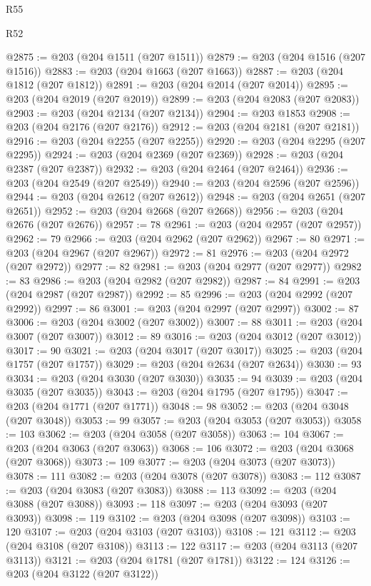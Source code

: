 \begin{lexlean}{R55}
\begin{lexlean}{R52}
\begin{coremodule}
{{{{{{{{{{{{{{{{{{{{{{{{{{{{{{{{{{{{{{{{{{{{{{{{{{{{{{{{{{{{{{{{{{{{{{{{{{{{{{{{{{{{{{{{{{{{{{{{{{{{{{{{{{{{{{{{{{{{{{{{{{{{{{{{{{{{{{{{{{{{{{{{{{{{{{{{{{{{{{{{{{{{{{{{{{{{{{{{{{{{{{{{{{{{{{{{{{{{{{@2875 := @203 (@204 @1511 (@207 @1511))
@2879 := @203 (@204 @1516 (@207 @1516))
@2883 := @203 (@204 @1663 (@207 @1663))
@2887 := @203 (@204 @1812 (@207 @1812))
@2891 := @203 (@204 @2014 (@207 @2014))
@2895 := @203 (@204 @2019 (@207 @2019))
@2899 := @203 (@204 @2083 (@207 @2083))
@2903 := @203 (@204 @2134 (@207 @2134))
@2904 := @203 @1853
@2908 := @203 (@204 @2176 (@207 @2176))
@2912 := @203 (@204 @2181 (@207 @2181))
@2916 := @203 (@204 @2255 (@207 @2255))
@2920 := @203 (@204 @2295 (@207 @2295))
@2924 := @203 (@204 @2369 (@207 @2369))
@2928 := @203 (@204 @2387 (@207 @2387))
@2932 := @203 (@204 @2464 (@207 @2464))
@2936 := @203 (@204 @2549 (@207 @2549))
@2940 := @203 (@204 @2596 (@207 @2596))
@2944 := @203 (@204 @2612 (@207 @2612))
@2948 := @203 (@204 @2651 (@207 @2651))
@2952 := @203 (@204 @2668 (@207 @2668))
@2956 := @203 (@204 @2676 (@207 @2676))
@2957 := 78
@2961 := @203 (@204 @2957 (@207 @2957))
@2962 := 79
@2966 := @203 (@204 @2962 (@207 @2962))
@2967 := 80
@2971 := @203 (@204 @2967 (@207 @2967))
@2972 := 81
@2976 := @203 (@204 @2972 (@207 @2972))
@2977 := 82
@2981 := @203 (@204 @2977 (@207 @2977))
@2982 := 83
@2986 := @203 (@204 @2982 (@207 @2982))
@2987 := 84
@2991 := @203 (@204 @2987 (@207 @2987))
@2992 := 85
@2996 := @203 (@204 @2992 (@207 @2992))
@2997 := 86
@3001 := @203 (@204 @2997 (@207 @2997))
@3002 := 87
@3006 := @203 (@204 @3002 (@207 @3002))
@3007 := 88
@3011 := @203 (@204 @3007 (@207 @3007))
@3012 := 89
@3016 := @203 (@204 @3012 (@207 @3012))
@3017 := 90
@3021 := @203 (@204 @3017 (@207 @3017))
@3025 := @203 (@204 @1757 (@207 @1757))
@3029 := @203 (@204 @2634 (@207 @2634))
@3030 := 93
@3034 := @203 (@204 @3030 (@207 @3030))
@3035 := 94
@3039 := @203 (@204 @3035 (@207 @3035))
@3043 := @203 (@204 @1795 (@207 @1795))
@3047 := @203 (@204 @1771 (@207 @1771))
@3048 := 98
@3052 := @203 (@204 @3048 (@207 @3048))
@3053 := 99
@3057 := @203 (@204 @3053 (@207 @3053))
@3058 := 103
@3062 := @203 (@204 @3058 (@207 @3058))
@3063 := 104
@3067 := @203 (@204 @3063 (@207 @3063))
@3068 := 106
@3072 := @203 (@204 @3068 (@207 @3068))
@3073 := 109
@3077 := @203 (@204 @3073 (@207 @3073))
@3078 := 111
@3082 := @203 (@204 @3078 (@207 @3078))
@3083 := 112
@3087 := @203 (@204 @3083 (@207 @3083))
@3088 := 113
@3092 := @203 (@204 @3088 (@207 @3088))
@3093 := 118
@3097 := @203 (@204 @3093 (@207 @3093))
@3098 := 119
@3102 := @203 (@204 @3098 (@207 @3098))
@3103 := 120
@3107 := @203 (@204 @3103 (@207 @3103))
@3108 := 121
@3112 := @203 (@204 @3108 (@207 @3108))
@3113 := 122
@3117 := @203 (@204 @3113 (@207 @3113))
@3121 := @203 (@204 @1781 (@207 @1781))
@3122 := 124
@3126 := @203 (@204 @3122 (@207 @3122))
}}}}}}}}}}}}}}}}}}}}}}}}}}}}}}}}}}}}}}}}}}}}}}}}}}}}}}}}}}}}}}}}}}}}}}}}}}}}}}}}}}}}}}}}}}}}}}}}}}}}}}}}}}}}}}}}}}}}}}}}}}}}}}}}}}}}}}}}}}}}}}}}}}}}}}}}}}}}}}}}}}}}}}}}}}}}}}}}}}}}}}}}}}}}}}}}}}}}}}
\end{coremodule}
\end{lexlean}
\end{lexlean}
